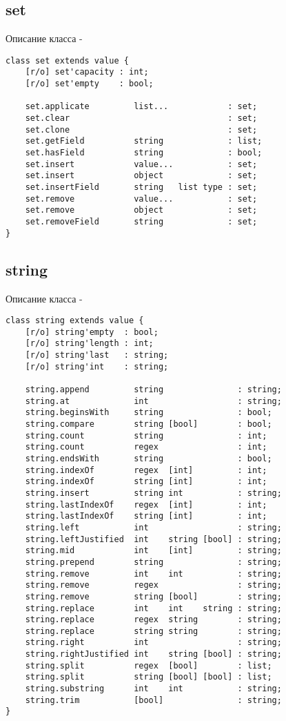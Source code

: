\subsection{{\color{lightblue} set}}

\noindent Описание класса \set -
\begin{lstlisting}[numbers=none]
class set extends value {
    [r/o] set'capacity : int;
    [r/o] set'empty    : bool;

    set.applicate         list...            : set;
    set.clear                                : set;
    set.clone                                : set;
    set.getField          string             : list;
    set.hasField          string             : bool;
    set.insert            value...           : set;
    set.insert            object             : set;
    set.insertField       string   list type : set;
    set.remove            value...           : set;
    set.remove            object             : set;
    set.removeField       string             : set;
}
\end{lstlisting}

\subsection{{\color{lightblue} string}}

\noindent Описание класса \str -
\begin{lstlisting}[numbers=none]
class string extends value {
    [r/o] string'empty  : bool;
    [r/o] string'length : int;
    [r/o] string'last   : string;
    [r/o] string'int    : string;

    string.append         string               : string;
    string.at             int                  : string;
    string.beginsWith     string               : bool;
    string.compare        string [bool]        : bool;
    string.count          string               : int;
    string.count          regex                : int;
    string.endsWith       string               : bool;
    string.indexOf        regex  [int]         : int;
    string.indexOf        string [int]         : int;
    string.insert         string int           : string;
    string.lastIndexOf    regex  [int]         : int;
    string.lastIndexOf    string [int]         : int;
    string.left           int                  : string;
    string.leftJustified  int    string [bool] : string;
    string.mid            int    [int]         : string;
    string.prepend        string               : string;
    string.remove         int    int           : string;
    string.remove         regex                : string;
    string.remove         string [bool]        : string;
    string.replace        int    int    string : string;
    string.replace        regex  string        : string;
    string.replace        string string        : string;
    string.right          int                  : string;
    string.rightJustified int    string [bool] : string;
    string.split          regex  [bool]        : list;
    string.split          string [bool] [bool] : list;
    string.substring      int    int           : string;
    string.trim           [bool]               : string;
}
\end{lstlisting}



